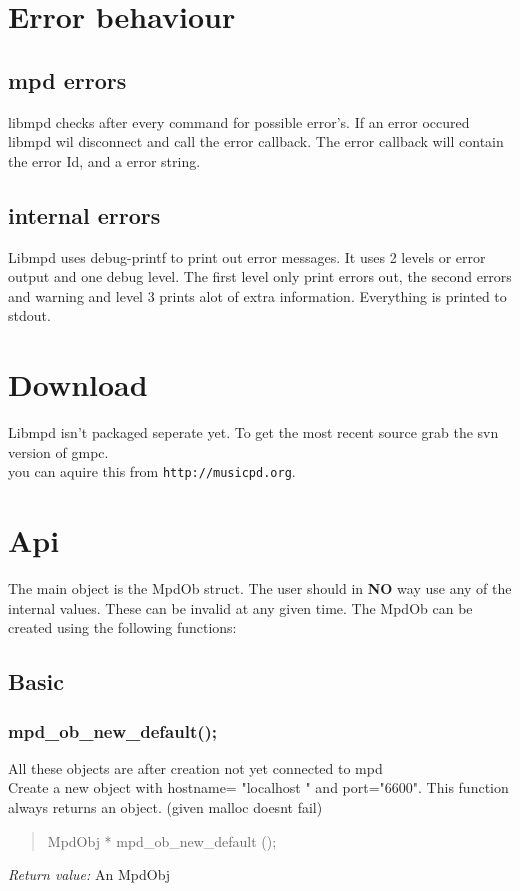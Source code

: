 \documentclass[a4paper,11pt]{article}
\newcommand{\tmstrong}[1]{\textbf{#1}}
\begin{document}
\section{Error behaviour}
\subsection{mpd errors}
libmpd checks after every command for possible error's. If an error occured
libmpd wil disconnect and call the error callback. The error callback will
contain the error Id, and a error string.
\subsection {internal errors}
Libmpd uses debug-printf to print out error messages. It uses 2 levels or error output and one debug level.
The first level only print errors out, the second errors and warning and level 3 prints alot of extra information.
Everything is printed to stdout.

\section{Download}
Libmpd isn't packaged seperate yet. To get the most recent source grab the svn version of gmpc.\\
you can aquire this from \verb|http://musicpd.org|.\\


\section{Api}
The main object is the MpdOb struct. The user should in {\tmstrong{NO}} way
use any of the internal values. These can be invalid at any given time. The
MpdOb can be created using the following functions:

\subsection{Basic}
\subsubsection{mpd\_ob\_new\_default();}
All these objects are after creation not yet connected to mpd\\
Create a new object with hostname= "localhost " and port="6600". This function always returns an object. (given malloc doesnt fail)\\
\begin{quote}
MpdObj * mpd\_ob\_new\_default (); 
\end{quote}
\textit{Return value:} An MpdObj
\end{document}
